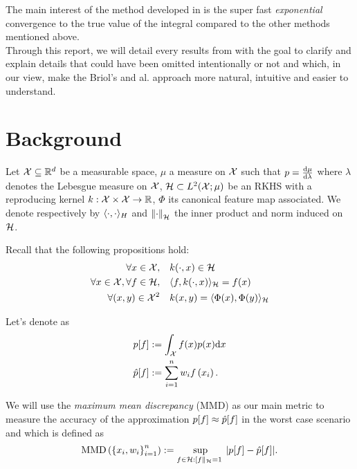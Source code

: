   The main interest of the method developed in \cite{FWBQ} is the super fast
  \textit{exponential} convergence to the true value of the integral compared to the other methods mentioned above.\\

  Through this report, we will detail every results from \cite{FWBQ} with the goal
  to clarify and explain details that could have been omitted intentionally or not and which, in our view, make the Briol's and al. approach more natural, intuitive and easier
  to understand.

\section{Background}
Let $\mathcal{X} \subseteq \mathbb{R} ^ { d }$ be a measurable space, $\mu$ a measure on $\mathcal{X}$ such
that $p = \frac{\mathop{}\mathopen{}\mathrm{d} \mu}{ \mathop{}\mathopen{}\mathrm{d} \lambda}$ where $\lambda$ denotes the Lebesgue measure on $\mathcal{X}$,
  $\mathcal{H} \subset L^2(\mathcal{X}; \mu)$ be an RKHS with a
 reproducing kernel $k: \mathcal{X} \times \mathcal{X} \rightarrow \mathbb{R}$, $\Phi$ its canonical feature
 map associated. We denote respectively by $\langle \cdot, \cdot \rangle_{H}$ and $\norme{\cdot}_{\H}$
 the inner product and norm induced on $\mathcal{H}$.

 Recall that the following propositions hold:
 \begin{align}
\forall x \in \mathcal { X } , \quad &k ( \cdot , x ) \in \mathcal { H }\\
\forall x \in \mathcal { X } , \forall f \in \mathcal { H } , \quad &\langle f , k ( \cdot , x ) \rangle _ { \mathcal { H } } = f ( x )\\
\forall (x,y) \in \mathcal { X }^2 \quad &k(x,y) = \langle \Phi(x), \Phi(y) \rangle_{\mathcal{H}}
\end{align}

Let's denote as \cite{FWBQ}
\begin{align*}
  p[f] &:= \int _ { \mathcal { X } } f ( x ) p ( x ) \mathrm { d } x\\
  \hat{p}[f]&:=\sum _ { i = 1 } ^ { n } w _ { i } f \left( x _ { i } \right).
\end{align*}

We will use the \textit{maximum mean discrepancy} (MMD) as our main metric to measure
 the accuracy of the approximation $p[f] \approx \hat{p}[f]$ in the worst case scenario and which is defined as
 $$\operatorname { MMD } \left( \left\{ x _ { i } , w _ { i } \right\} _ { i = 1 } ^ { n } \right) : = \sup _ { f \in \mathcal { H } : \left[ f \left\| _ { \mathcal{H} } = 1 \right. \right. } | p [ f ] - \hat { p } [ f ] |.$$

